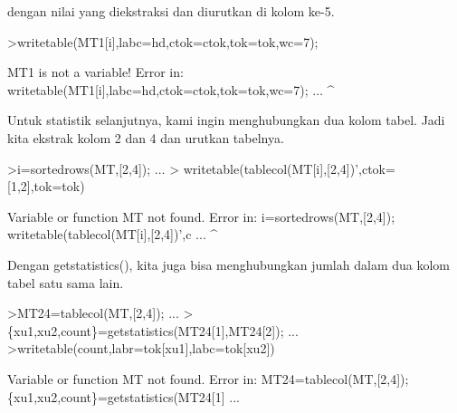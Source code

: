 \documentclass[a4paper,10pt]{article}
\begin{document}
\begin{eulernotebook}
\begin{eulercomment}
\begin{eulercomment}
\begin{eulercomment}
\begin{eulercomment}
\begin{eulercomment}
\begin{eulercomment}
\begin{eulercomment}
\begin{eulercomment}
\begin{eulercomment}
\begin{eulercomment}
\begin{eulercomment}
\begin{eulercomment}
\begin{eulercomment}
\begin{eulercomment}
\begin{eulercomment}
\begin{eulercomment}
\begin{eulercomment}
\begin{eulercomment}
\begin{eulercomment}
\begin{eulercomment}
\begin{eulercomment}
\begin{eulercomment}
\begin{eulercomment}
\begin{eulercomment}
\begin{eulercomment}
\begin{eulercomment}
\begin{eulercomment}
\begin{eulercomment}
\begin{eulercomment}
\begin{eulercomment}
\begin{eulercomment}
\begin{eulercomment}
\begin{eulercomment}
\begin{eulercomment}
\begin{eulercomment}
\begin{eulercomment}
\begin{eulercomment}
\begin{eulercomment}
\begin{eulercomment}
\begin{eulercomment}
\begin{eulercomment}
\begin{eulercomment}
\begin{eulercomment}
\begin{eulercomment}
\begin{eulercomment}
\begin{eulercomment}
\begin{eulercomment}
\begin{eulercomment}
\begin{eulercomment}
\begin{eulercomment}
\begin{eulercomment}
\begin{eulercomment}
\begin{eulercomment}
\begin{eulercomment}
\begin{eulercomment}
\begin{eulercomment}
\begin{eulercomment}
\begin{eulercomment}
\begin{eulercomment}
\begin{eulercomment}
\begin{eulercomment}
\begin{eulercomment}
\begin{eulercomment}
\begin{eulercomment}
\begin{eulercomment}
\begin{eulercomment}
\begin{eulercomment}
dengan nilai yang diekstraksi dan
diurutkan di kolom ke-5.
\end{eulercomment}
\begin{eulerprompt}
>writetable(MT1[i],labc=hd,ctok=ctok,tok=tok,wc=7);
\end{eulerprompt}
\begin{euleroutput}
  MT1 is not a variable!
  Error in:
  writetable(MT1[i],labc=hd,ctok=ctok,tok=tok,wc=7); ...
                   ^
\end{euleroutput}
\begin{eulercomment}
Untuk statistik selanjutnya, kami ingin menghubungkan dua kolom tabel.
Jadi kita ekstrak kolom 2 dan 4 dan urutkan tabelnya.
\end{eulercomment}
\begin{eulerprompt}
>i=sortedrows(MT,[2,4]);  ...
>  writetable(tablecol(MT[i],[2,4])',ctok=[1,2],tok=tok)
\end{eulerprompt}
\begin{euleroutput}
  Variable or function MT not found.
  Error in:
  i=sortedrows(MT,[2,4]);    writetable(tablecol(MT[i],[2,4])',c ...
                 ^
\end{euleroutput}
\begin{eulercomment}
Dengan getstatistics(), kita juga bisa menghubungkan jumlah dalam dua
kolom tabel satu sama lain.
\end{eulercomment}
\begin{eulerprompt}
>MT24=tablecol(MT,[2,4]); ...
>\{xu1,xu2,count\}=getstatistics(MT24[1],MT24[2]); ...
>writetable(count,labr=tok[xu1],labc=tok[xu2])
\end{eulerprompt}
\begin{euleroutput}
  Variable or function MT not found.
  Error in:
  MT24=tablecol(MT,[2,4]); \{xu1,xu2,count\}=getstatistics(MT24[1] ...
             
\end{euleroutput}
\end{eulercomment}
\end{eulercomment}
\end{eulercomment}
\end{eulercomment}
\end{eulercomment}
\end{eulercomment}
\end{eulercomment}
\end{eulercomment}
\end{eulercomment}
\end{eulercomment}
\end{eulercomment}
\end{eulercomment}
\end{eulercomment}
\end{eulercomment}
\end{eulercomment}
\end{eulercomment}
\end{eulercomment}
\end{eulercomment}
\end{eulercomment}
\end{eulercomment}
\end{eulercomment}
\end{eulercomment}
\end{eulercomment}
\end{eulercomment}
\end{eulercomment}
\end{eulercomment}
\end{eulercomment}
\end{eulercomment}
\end{eulercomment}
\end{eulercomment}
\end{eulercomment}
\end{eulercomment}
\end{eulercomment}
\end{eulercomment}
\end{eulercomment}
\end{eulercomment}
\end{eulercomment}
\end{eulercomment}
\end{eulercomment}
\end{eulercomment}
\end{eulercomment}
\end{eulercomment}
\end{eulercomment}
\end{eulercomment}
\end{eulercomment}
\end{eulercomment}
\end{eulercomment}
\end{eulercomment}
\end{eulercomment}
\end{eulercomment}
\end{eulercomment}
\end{eulercomment}
\end{eulercomment}
\end{eulercomment}
\end{eulercomment}
\end{eulercomment}
\end{eulercomment}
\end{eulercomment}
\end{eulercomment}
\end{eulercomment}
\end{eulercomment}
\end{eulercomment}
\end{eulercomment}
\end{eulercomment}
\end{eulercomment}
\end{eulercomment}
\end{eulernotebook}
\end{document}
